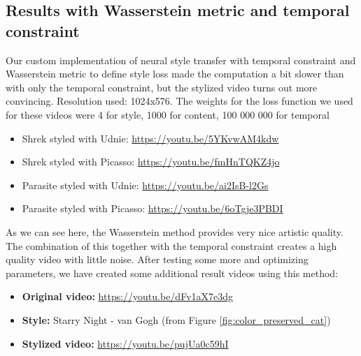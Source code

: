 \subsection{Results with Wasserstein metric and temporal constraint}
\label{sec:Results with wasserstein metric}
Our custom implementation of neural style transfer with temporal constraint and Wasserstein metric to define style loss made the computation a bit slower than with only the temporal constraint, but the stylized video turns out more convincing. \newline
Resolution used: 1024x576. The weights for the loss function we used for these videos were 4 for style, 1000 for content, 100 000 000 for temporal

\begin{itemize}
\item{Shrek styled with Udnie: \url{https://youtu.be/5YKvwAM4kdw}}
\item{Shrek styled with Picasso: \url{https://youtu.be/fmHnTQKZ4jo}}
\item{Parasite styled with Udnie: \url{https://youtu.be/ai2IsB-l2Gs}}
\item{Parasite styled with Picasso: \url{https://youtu.be/6oTgje3PBDI}}
\end{itemize} 
As we can see here, the Wasserstein method provides very nice artistic quality. The combination of this together with the temporal constraint creates a high quality video with little noise. After testing some more and optimizing parameters, we have created some additional result videos using this method:\newline
\begin{itemize}
    \item{\textbf{Original video: }\url{https://youtu.be/dFv1aX7e3dg}}
    \item{\textbf{Style:} Starry Night - van Gogh (from Figure \ref{fig:color_preserved_cat})}
    \item{\textbf{Stylized video:} \url{https://youtu.be/pujUa0c59hI}}
\end{itemize}